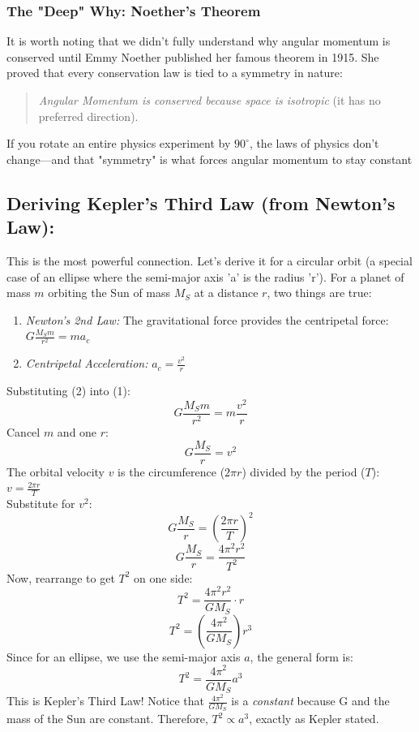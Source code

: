 \documentclass[a4paper,10pt]{article}
\begin{document}
\subsubsection{The "Deep" Why: Noether’s Theorem}
It is worth noting that we didn't fully understand why angular momentum is conserved until Emmy Noether published her famous theorem in 1915. She proved that every conservation law is tied to a symmetry in nature:
\begin{quote}
    \emph{Angular Momentum is conserved because space is isotropic} (it has no preferred direction).
\end{quote}
If you rotate an entire physics experiment by \(90^{\circ}\), the laws of physics don't change—and that "symmetry" is what forces angular momentum to stay constant
\subsection{Deriving Kepler's Third Law (from Newton's Law):}
This is the most powerful connection. Let's derive it for a circular orbit (a special case of an ellipse where the semi-major axis 'a' is the radius 'r').
For a planet of mass \( m \) orbiting the Sun of mass \( M_S \) at a distance \( r \), two things are true:
\begin{enumerate}
\item \emph{Newton's 2nd Law:} The gravitational force provides the centripetal force: \( G \frac{M_S m}{r^2} = m a_c \)
\item \emph{Centripetal Acceleration:} \( a_c = \frac{v^2}{r} \)
\end{enumerate}
Substituting (2) into (1):\\
\[
G \frac{M_S m}{r^2} = m \frac{v^2}{r}
\]
Cancel \( m \) and one \( r \):
\[
G \frac{M_S}{r} = v^2
\]
The orbital velocity \( v \) is the circumference (\( 2\pi r \)) divided by the period (\( T \)): \( v = \frac{2\pi r}{T} \)\\
Substitute for \( v^2 \):\\
\[
G \frac{M_S}{r} = \left( \frac{2\pi r}{T} \right)^2
\]
\[
G \frac{M_S}{r} = \frac{4\pi^2 r^2}{T^2}
\]
Now, rearrange to get \( T^2 \) on one side:\\
\[
T^2 = \frac{4\pi^2 r^2}{G M_S} \cdot r
\]
\[
T^2 = \left( \frac{4\pi^2}{G M_S} \right) r^3
\]
Since for an ellipse, we use the semi-major axis \( a \), the general form is:
\[
\boxed{T^2 = \frac{4\pi^2}{G M_S} a^3}
\]
This is Kepler's Third Law! Notice that \( \frac{4\pi^2}{G M_S} \) is a \emph{constant} because G and the mass of the Sun are constant. Therefore, \( T^2 \propto a^3 \), exactly as Kepler stated.
\end{document}

